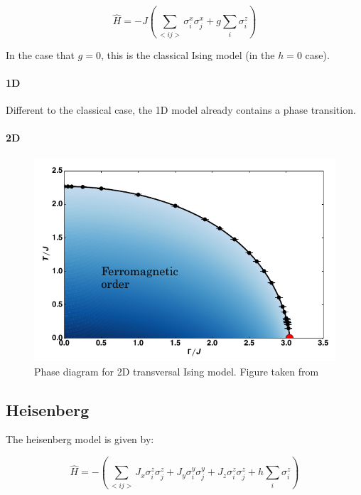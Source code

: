 \begin{equation}
    \hat{H} = -J \left (  \sum_{<i j>} \sigma^x_i \sigma^x_j + g \sum_i \sigma^z_i \right )
\end{equation}

In the case that $g=0$, this is the classical Ising model (in the $h=0$ case).

\paragraph{1D}
Different to the classical case, the 1D model already contains a phase transition.

\paragraph{2D}

\begin{figure}
    \center
    \includegraphics[width=\textwidth]{Figuren/phsyics/2disingphase.png}
    \caption{Phase diagram for 2D transversal Ising model. Figure taken from \cite{Hesselmann2016}}
    \label{2dtisingphasediag}
\end{figure}

\subsection{Heisenberg}

The heisenberg model is given by:

\begin{equation}
    \hat{H} =  -\left( \sum_{<i j>} J_x \sigma^z_i \sigma^z_j + J_y \sigma^y_i \sigma^y_j+ J_z \sigma^z_i \sigma^z_j + h \sum_i \sigma^z_i \right )
\end{equation}

